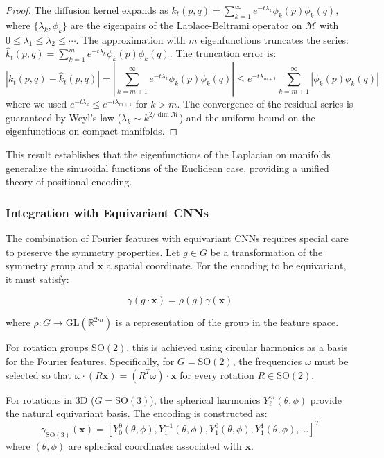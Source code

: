 \begin{proof}
The diffusion kernel expands as $k_t(p,q) = \sum_{k=1}^{\infty} e^{-t\lambda_k} \phi_k(p) \phi_k(q)$, where $\{\lambda_k, \phi_k\}$ are the eigenpairs of the Laplace-Beltrami operator on $\mathcal{M}$ with $0 \leq \lambda_1 \leq \lambda_2 \leq \cdots$. The approximation with $m$ eigenfunctions truncates the series: $\hat{k}_t(p,q) = \sum_{k=1}^{m} e^{-t\lambda_k} \phi_k(p) \phi_k(q)$. The truncation error is:
\[
|k_t(p,q) - \hat{k}_t(p,q)| = \left|\sum_{k=m+1}^{\infty} e^{-t\lambda_k} \phi_k(p) \phi_k(q)\right| \leq e^{-t\lambda_{m+1}} \sum_{k=m+1}^{\infty} |\phi_k(p) \phi_k(q)|
\]
where we used $e^{-t\lambda_k} \leq e^{-t\lambda_{m+1}}$ for $k > m$. The convergence of the residual series is guaranteed by Weyl's law ($\lambda_k \sim k^{2/\dim \mathcal{M}}$) and the uniform bound on the eigenfunctions on compact manifolds.
\end{proof}

This result establishes that the eigenfunctions of the Laplacian on manifolds generalize the sinusoidal functions of the Euclidean case, providing a unified theory of positional encoding.

\subsubsection{Integration with Equivariant CNNs}

The combination of Fourier features with equivariant CNNs requires special care to preserve the symmetry properties. Let $g \in G$ be a transformation of the symmetry group and $\mathbf{x}$ a spatial coordinate. For the encoding to be equivariant, it must satisfy:

\begin{equation}
\gamma(g \cdot \mathbf{x}) = \rho(g) \gamma(\mathbf{x})
\end{equation}

where $\rho: G \to \text{GL}(\mathbb{R}^{2m})$ is a representation of the group in the feature space.

For rotation groups $\text{SO}(2)$, this is achieved using circular harmonics as a basis for the Fourier features. Specifically, for $G = \text{SO}(2)$, the frequencies $\omega$ must be selected so that $\omega \cdot (R\mathbf{x}) = (R^T\omega) \cdot \mathbf{x}$ for every rotation $R \in \text{SO}(2)$.

For rotations in 3D ($G = \text{SO}(3)$), the spherical harmonics $Y_\ell^m(\theta, \phi)$ provide the natural equivariant basis. The encoding is constructed as:
\begin{equation}
\gamma_{\text{SO}(3)}(\mathbf{x}) = [Y_0^0(\theta, \phi), Y_1^{-1}(\theta, \phi), Y_1^0(\theta, \phi), Y_1^1(\theta, \phi), \ldots]^T
\end{equation}
where $(\theta, \phi)$ are spherical coordinates associated with $\mathbf{x}$.

